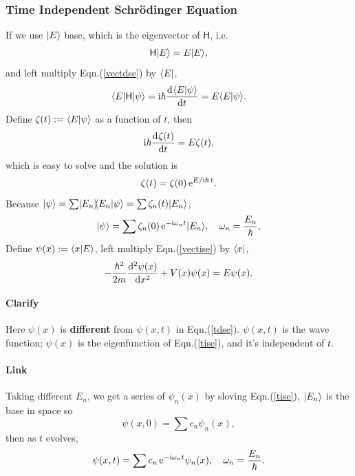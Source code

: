 \documentclass{article}
\newcommand*{\op}[1]{\mathsf{#1}}
\newcommand{\ko}[1]{\hspace{-#1 pt}}
\newcommand{\su}[1]{\vspace{-#1 pt}}
\newcommand{\spark}[1]{\textcolor{red}{#1}}
\begin{document}
\subsubsection{Time Independent Schrödinger Equation}
If we use $\ket E$ base, which is the eigenvector of $\op{H}$, i.e.
\begin{align}\label{vectise}
	\op{H}\ket E=E\ket E,
\end{align}
and left multiply Eqn.(\ref{vectdse}) by $\bra E$,
$$\bra E\op{H}\ket\psi=\i\hbar\dv{\brkt E\psi}t=E\brkt E\psi.$$
Define $\zeta(t):=\brkt E\psi$ as a function of $t$, then
$$\i\hbar\dv{\zeta(t)}t=E\zeta(t),$$
which is easy to solve and the solution is
$$\zeta(t)=\zeta(0)\e^{E/\i\hbar\,t}.$$
Because $\ket\psi=\sum\ket{E_n}\ko3\brkt{E_n}\psi=\sum\zeta_n(t)\ket{E_n}$,
$$\ket\psi=\sum\zeta_n(0)\e^{-\i\omega_nt}\ket{E_n},\quad\omega_n=\frac{E_n}\hbar,$$
Define $\psi(x):=\brkt xE$, left multiply Eqn.(\ref{vectise}) by $\bra x$,
\spark{\begin{align}\label{tise}
		-\frac{\hbar^2}{2m}\dv[2]{\psi(x)}x+V(x)\psi(x)=E\psi(x).
	\end{align}}\su{20}
\paragraph{Clarify}Here $\psi(x)$ is \textbf{different} from $\psi(x,t)$ in Eqn.(\ref{tdse}). $\psi(x,t)$ is the wave function; $\psi(x)$ is the eigenfunction of Eqn.(\ref{tise}), and it's independent of $t$.
\paragraph{Link}Taking different $E_n$, we get a series of $\psi_n(x)$ by sloving Eqn.(\ref{tise}), $\ket{E_n}$ is the base in space so
$$\psi(x,0)=\sum c_n\psi_n(x),$$
then as $t$ evolves,
$$\psi(x,t)=\sum c_n\e^{-\i\omega_nt}\psi_n(x),\quad\omega_n=\frac{E_n}\hbar.$$
\newpage
\end{document}
